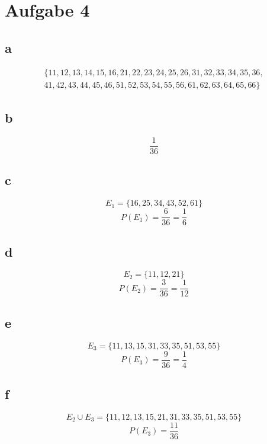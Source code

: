 
\section{Aufgabe 4}
\subsection{a}
\[ \begin{array}{l}
\{11,12,13,14,15,16,21,22,23,24,25,26,31,32,33,34,35,36,\\
41,42,43,44,45,46,51,52,53,54,55,56,61,62,63,64,65,66\}
\end{array} \]

\subsection{b}
\[ \frac{1}{36} \]

\subsection{c}
\[ E_1 = \{16,25,34,43,52,61\} \]
\[ P(E_1) = \frac{6}{36} = \frac{1}{6} \]

\subsection{d}
\[ E_2 = \{11,12,21\} \]
\[ P(E_2) = \frac{3}{36} = \frac{1}{12} \]

\subsection{e}
\[ E_3 = \{11,13,15,31,33,35,51,53,55\} \]
\[ P(E_3) = \frac{9}{36} = \frac{1}{4} \]

\subsection{f}
\[ E_2 \cup E_3 = \{11,12,13,15,21,31,33,35,51,53,55\} \]
\[ P(E_3) = \frac{11}{36} \]
